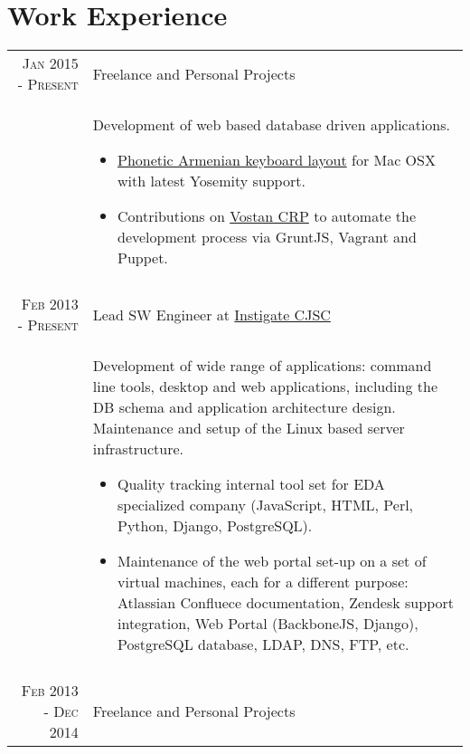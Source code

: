 \documentclass[a4paper,10pt]{article}
\begin{document}
\section{Work Experience}
\begin{tabular}{r|p{11cm}}

\textsc{Jan 2015 - Present}
  & Freelance and Personal Projects \\ 
  & \footnotesize{ Development of web based database driven applications.
    \begin{itemize}
      \item \href{https://github.com/vahe-evoyan/armenian-phonetic/releases}
        {Phonetic Armenian keyboard layout} for Mac OSX with latest Yosemity
        support.
      \item Contributions on \href{https://github.com/InstigateMobile/vostan}
        {Vostan CRP} to automate the development process via GruntJS, Vagrant
        and Puppet.
    \end{itemize}
  } \\


\multicolumn{2}{c}{} \\


\textsc{Feb 2013 - Present} 
  & Lead SW Engineer at 
    \href{http://www.instigatedesign.com/}{Instigate CJSC} \\ 

& \footnotesize{ Development of wide range of applications: command line tools,
desktop and web applications, including the DB schema and application
architecture design. Maintenance and setup of the Linux based server infrastructure.
  \begin{itemize}
    \item Quality tracking internal tool set for EDA specialized company
      (JavaScript, HTML, Perl, Python, Django, PostgreSQL).
    \item Maintenance of the web portal set-up on a set of virtual machines,
      each for a different purpose: Atlassian Confluece documentation, Zendesk
      support integration, Web Portal (BackboneJS, Django), PostgreSQL
      database, LDAP, DNS, FTP, etc.
  \end{itemize} 
} \\


\multicolumn{2}{c}{} \\


\textsc{Feb 2013 - Dec 2014} 
  & Freelance and Personal Projects \\


\end{tabular}
\end{document}

